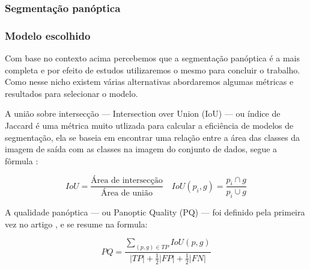 
\subsubsection*{Segmentação panóptica}


\subsubsection*{Modelo escolhido}

Com base no contexto acima percebemos que a segmentação panóptica é a mais completa e por efeito de estudos utilizaremos o mesmo para concluir o trabalho. Como nesse nicho existem várias alternativas abordaremos algumas métricas e resultados para selecionar o modelo.


A união sobre intersecção — Intersection over Union (IoU) — ou índice de Jaccard é uma métrica muito utlizada para calcular a eficiência de modelos de segmentação, ela se baseia em encontrar uma relação entre a área das classes da imagem de saída com as classes na imagem do conjunto de dados, segue a fôrmula \cite{dp_semantic_segmantation, lapix, kirillov2019panoptic}:

$$ 
IoU = \frac{\text{Área de intersecção}}{\text{Área de união}} \quad IoU(p_i, g) = \frac{p_i \cap g}{ p_i \cup g}
$$



A qualidade panóptica — ou Panoptic Quality (PQ) — foi definido pela primeira vez no artigo , e se resume na formula:

\begin{equation}
\label{eq:pq_metric}
PQ = \frac{\sum_{(p,g)\in TP}IoU(p,g)}{ |TP| + \frac{1}{2}|FP| + \frac{1}{2}|FN|}
\end{equation}

